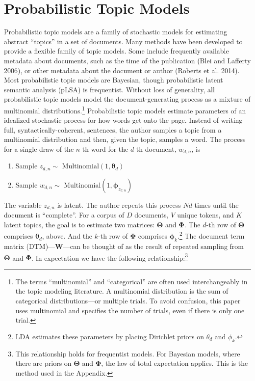 \documentclass[conference,final,]{IEEEtran}
\providecommand{\tightlist}{%
  \setlength{\itemsep}{0pt}\setlength{\parskip}{0pt}}
\begin{document}
\hypertarget{probabilistic-topic-models}{%
\section{Probabilistic Topic Models}\label{probabilistic-topic-models}}

Probabilistic topic models are a family of stochastic models for
estimating abstract ``topics'' in a set of documents. Many methods have
been developed to provide a flexible family of topic models. Some
include frequently available metadata about documents, such as the time
of the publication (Blei and Lafferty 2006), or other metadata about the
document or author (Roberts et al. 2014). Most probabilistic topic
models are Bayesian, though probabilistic latent semantic analysis
(pLSA) is frequentist. Without loss of generality, all probabilistic
topic models model the document-generating process as a mixture of
multinomial distributions.\footnote{The terms ``multinomial'' and
  ``categorical'' are often used interchangeably in the topic modeling
  literature. A multinomial distribution is the sum of categorical
  distributions---or multiple trials. To avoid confusion, this paper
  uses multinomial and specifies the number of trials, even if there is
  only one trial.} Probabilistic topic models estimate parameters of an
idealized stochastic process for how words get onto the page. Instead of
writing full, syntactically-coherent, sentences, the author samples a
topic from a multinomial distribution and then, given the topic, samples
a word. The process for a single draw of the \(n\)-th word for the
\(d\)-th document, \(w_{d,n}\), is

\begin{enumerate}
\def\labelenumi{\arabic{enumi}.}
\tightlist
\item
  Sample \(z_{d,n}\sim\) \(\text{Multinomial}(1,\boldsymbol\theta_d)\)
\item
  Sample \(w_{d,n}\sim\)
  \(\text{Multinomial}(1,\boldsymbol\phi_{z_{d,n}})\)
\end{enumerate}

The variable \(z_{d,n}\) is latent. The author repeats this process
\(Nd\) times until the document is ``complete''. For a corpus of \(D\)
documents, \(V\) unique tokens, and \(K\) latent topics, the goal is to
estimate two matrices: \(\boldsymbol\Theta\) and \(\boldsymbol\Phi\).
The \(d\)-th row of \(\boldsymbol\Theta\) comprises
\(\boldsymbol\theta_d\), above. And the \(k\)-th row of
\(\boldsymbol\Phi\) comprises \(\boldsymbol\phi_k\).\footnote{LDA
  estimates these parameters by placing Dirichlet priors on \(\theta_d\)
  and \(\phi_k\).} The document term matrix (DTM)---\(\mathbf{W}\)---can
be thought of as the result of repeated sampling from
\(\boldsymbol\Theta\) and \(\boldsymbol\Phi\). In expectation we have
the following relationship:\footnote{This relationship holds for
  frequentist models. For Bayesian models, where there are priors on
  \(\boldsymbol\Theta\) and \(\boldsymbol\Phi\), the law of total
  expectation applies. This is the method used in the Appendix.}
\end{document}
